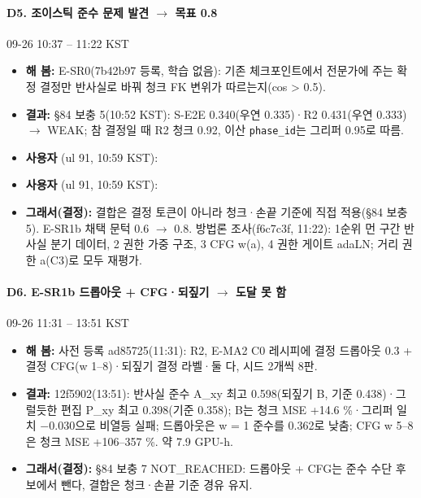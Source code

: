 \paragraph{D5. 조이스틱 준수 문제 발견 $\rightarrow$ 목표 0.8}
{\small 09-26 10:37 -- 11:22 KST}
\begin{itemize}
  \item \textbf{해 봄:} E-SR0(7b42b97 등록, 학습 없음): 기존 체크포인트에서 전문가에 주는 확정 결정만 반사실로 바꿔 청크 FK 변위가 따르는지(cos > 0.5).
  \item \textbf{결과:} §84 보충 5(10:52 KST): S-E2E 0.340(우연 0.335)·R2 0.431(우연 0.333) $\rightarrow$ WEAK; 참 결정일 때 R2 청크 0.92, 이산 \texttt{phase\_\allowbreak{}id}는 그리퍼 0.95로 따름.
  \item \textbf{사용자} (ul 91, 10:59 KST): 
  \item \textbf{사용자} (ul 91, 10:59 KST): 
  \item \textbf{그래서(결정):} 결합은 결정 토큰이 아니라 청크·손끝 기준에 직접 적용(§84 보충 5). E-SR1b 채택 문턱 0.6 $\rightarrow$ 0.8. 방법론 조사(f6c7c3f, 11:22): 1순위 먼 구간 반사실 분기 데이터, 2 권한 가중 구조, 3 CFG w(a), 4 권한 게이트 adaLN; 거리 권한 a(C3)로 모두 재평가.
\end{itemize}

\paragraph{D6. E-SR1b 드롭아웃 + CFG·되짚기 $\rightarrow$ 도달 못 함}
{\small 09-26 11:31 -- 13:51 KST}
\begin{itemize}
  \item \textbf{해 봄:} 사전 등록 ad85725(11:31): R2, E-MA2 C0 레시피에 결정 드롭아웃 0.3 + 결정 CFG(w 1--8)·되짚기 결정 라벨·둘 다, 시드 2개씩 8판.
  \item \textbf{결과:} 12f5902(13:51): 반사실 준수 A\_xy 최고 0.598(되짚기 B, 기준 0.438)·그럴듯한 편집 P\_xy 최고 0.398(기준 0.358); B는 청크 MSE +14.6 \%·그리퍼 일치 $-$0.030으로 비열등 실패; 드롭아웃은 w = 1 준수를 0.362로 낮춤; CFG w 5--8은 청크 MSE +106--357 \%. 약 7.9 GPU-h.
  \item \textbf{그래서(결정):} §84 보충 7 NOT\_REACHED: 드롭아웃 + CFG는 준수 수단 후보에서 뺀다, 결합은 청크·손끝 기준 경유 유지.
\end{itemize}

